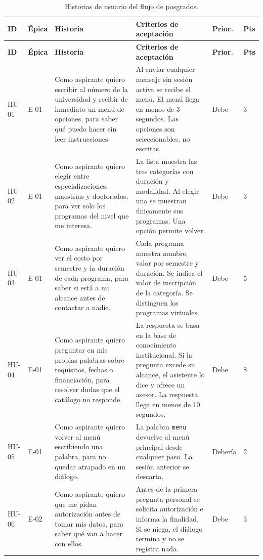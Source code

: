 \documentclass[12pt,a4paper]{report}
\newcommand{\tablacompacta}{\setstretch{1.1}\small}
\newcommand{\cabecera}[1]{\rowcolor{filacabecera}#1}
\begin{document}
{\tablacompacta
\begin{longtable}{p{1.2cm}p{0.9cm}p{5.2cm}p{5.0cm}p{1.1cm}p{0.7cm}}
\caption{Historias de usuario del flujo de posgrados.}\label{tab:hu}\\
\toprule
\cabecera{\textbf{ID}} & \textbf{Épica} & \textbf{Historia} & \textbf{Criterios de aceptación} & \textbf{Prior.} & \textbf{Pts} \\
\midrule
\endfirsthead
\toprule
\textbf{ID} & \textbf{Épica} & \textbf{Historia} & \textbf{Criterios de aceptación} & \textbf{Prior.} & \textbf{Pts} \\
\midrule
\endhead
\bottomrule
\endfoot
HU-01 & E-01 & Como aspirante quiero escribir al número de la universidad y recibir de inmediato un menú de opciones, para saber qué puedo hacer sin leer instrucciones. & Al enviar cualquier mensaje sin sesión activa se recibe el menú. El menú llega en menos de 3 segundos. Las opciones son seleccionables, no escritas. & Debe & 3 \\
HU-02 & E-01 & Como aspirante quiero elegir entre especializaciones, maestrías y doctorados, para ver solo los programas del nivel que me interesa. & La lista muestra las tres categorías con duración y modalidad. Al elegir una se muestran únicamente sus programas. Una opción permite volver. & Debe & 3 \\
HU-03 & E-01 & Como aspirante quiero ver el costo por semestre y la duración de cada programa, para saber si está a mi alcance antes de contactar a nadie. & Cada programa muestra nombre, valor por semestre y duración. Se indica el valor de inscripción de la categoría. Se distinguen los programas virtuales. & Debe & 5 \\
HU-04 & E-01 & Como aspirante quiero preguntar en mis propias palabras sobre requisitos, fechas o financiación, para resolver dudas que el catálogo no responde. & La respuesta se basa en la base de conocimiento institucional. Si la pregunta excede su alcance, el asistente lo dice y ofrece un asesor. La respuesta llega en menos de 10 segundos. & Debe & 8 \\
HU-05 & E-01 & Como aspirante quiero volver al menú escribiendo una palabra, para no quedar atrapado en un diálogo. & La palabra \texttt{menu} devuelve al menú principal desde cualquier paso. La sesión anterior se descarta. & Debería & 2 \\
HU-06 & E-02 & Como aspirante quiero que me pidan autorización antes de tomar mis datos, para saber qué van a hacer con ellos. & Antes de la primera pregunta personal se solicita autorización e informa la finalidad. Si se niega, el diálogo termina y no se registra nada. & Debe & 3 \\

\end{longtable}}
\end{document}
